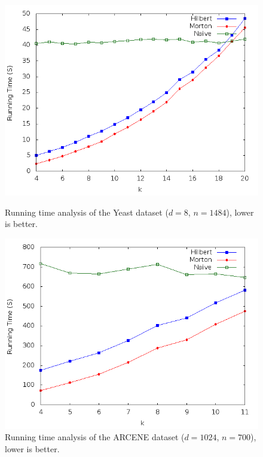 \documentclass[10pt]{article}
\begin{document}
\begin{figure}
\begin{center}
\includegraphics[scale=0.5]{YeaGra.png}
\caption{Running time analysis of the Yeast dataset ($d = 8$, $n = 1484$), lower is better.}
\label{run-yeast}
\par\vspace{\intextsep}
\includegraphics[scale=0.5]{ArcGra.png}
\caption{Running time analysis of the ARCENE dataset ($d = 1024$, $n = 700$), lower is better.}
\label{run-arcene}
\end{center}
\end{figure}
\end{document}
